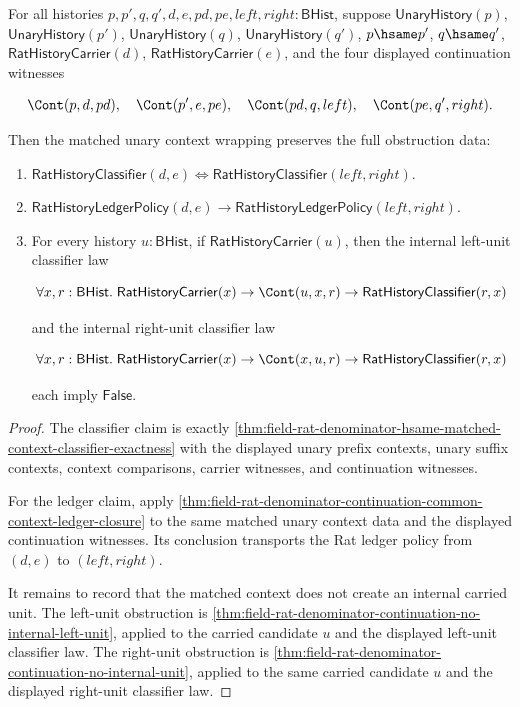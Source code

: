 \begin{theorem}
\label{thm:field-rat-denominator-context-invariant-obstruction-package}
For all histories
$p,p',q,q',d,e,pd,pe,left,right:\mathsf{BHist}$, suppose
$\mathsf{UnaryHistory}(p)$, $\mathsf{UnaryHistory}(p')$,
$\mathsf{UnaryHistory}(q)$, $\mathsf{UnaryHistory}(q')$, $p\hsame p'$,
$q\hsame q'$, $\mathsf{RatHistoryCarrier}(d)$,
$\mathsf{RatHistoryCarrier}(e)$, and the four displayed continuation
witnesses

$$
\Cont(p,d,pd),\quad
\Cont(p',e,pe),\quad
\Cont(pd,q,left),\quad
\Cont(pe,q',right).
$$

Then the matched unary context wrapping preserves the full obstruction data:
\begin{enumerate}
\item
$\mathsf{RatHistoryClassifier}(d,e)\Longleftrightarrow
\mathsf{RatHistoryClassifier}(left,right)$.
\item
$\mathsf{RatHistoryLedgerPolicy}(d,e)\to
\mathsf{RatHistoryLedgerPolicy}(left,right)$.
\item
For every history $u:\mathsf{BHist}$, if
$\mathsf{RatHistoryCarrier}(u)$, then the internal left-unit classifier law

$$
\forall x,r:\mathsf{BHist}.\;
\mathsf{RatHistoryCarrier}(x)\to
\Cont(u,x,r)\to
\mathsf{RatHistoryClassifier}(r,x)
$$

and the internal right-unit classifier law

$$
\forall x,r:\mathsf{BHist}.\;
\mathsf{RatHistoryCarrier}(x)\to
\Cont(x,u,r)\to
\mathsf{RatHistoryClassifier}(r,x)
$$

each imply $\mathsf{False}$.
\end{enumerate}
\end{theorem}
\begin{proof}
The classifier claim is exactly
\autoref{thm:field-rat-denominator-hsame-matched-context-classifier-exactness}
with the displayed unary prefix contexts, unary suffix contexts, context
comparisons, carrier witnesses, and continuation witnesses.

For the ledger claim, apply
\autoref{thm:field-rat-denominator-continuation-common-context-ledger-closure}
to the same matched unary context data and the displayed continuation
witnesses. Its conclusion transports the Rat ledger policy from $(d,e)$ to
$(left,right)$.

It remains to record that the matched context does not create an internal
carried unit. The left-unit obstruction is
\autoref{thm:field-rat-denominator-continuation-no-internal-left-unit}, applied
to the carried candidate $u$ and the displayed left-unit classifier law. The
right-unit obstruction is
\autoref{thm:field-rat-denominator-continuation-no-internal-unit}, applied to
the same carried candidate $u$ and the displayed right-unit classifier law.
\end{proof}

